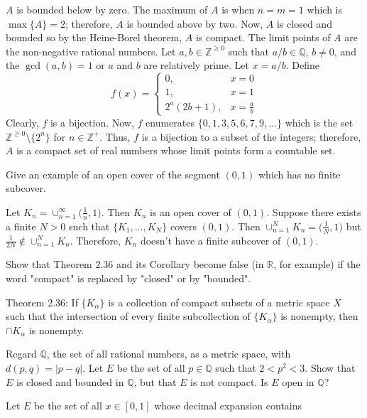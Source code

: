 \begin{exercise}
  \(A\) is bounded below by zero.
  The maximum of \(A\) is when \(n = m = 1\) which is \(\max\{A\} = 2\);
  therefore, \(A\) is bounded above by two.
  Now, \(A\) is closed and bounded so by the Heine-Borel theorem, \(A\) is
  compact.
  The limit points of \(A\) are the non-negative rational numbers.
  Let \(a,b\in\mathbb{Z}^{\geq 0}\) such that \(a/b\in\mathbb{Q}\),
  \(b\neq 0\), and the \(\gcd(a,b) = 1\) or \(a\) and \(b\) are relatively
  prime.
  Let \(x = a/b\).
  Define
  \[
  f(x) =
  \begin{cases}
    0, & x = 0\\
    1, & x = 1\\
    2^a(2b + 1), & x = \frac{a}{b}
  \end{cases}
  \]
  Clearly, \(f\) is a bijection.
  Now, \(f\) enumerates \(\{0,1,3,5,6,7,9,\ldots\}\) which is the set
  \(\mathbb{Z}^{\geq 0}\setminus\{2^n\}\) for \(n\in\mathbb{Z}^+\).
  Thus, \(f\) is a bijection to a subset of the integers; therefore, \(A\) is
  a compact set of real numbers whose limit points form a countable set.
\item
  Give an example of an open cover of the segment \((0,1)\) which has no
  finite subcover.
  \par\smallskip
  Let \(K_n = \cup_{n = 1}^{\infty}\bigl(\frac{1}{n},1\bigr)\).
  Then \(K_n\) is an open cover of \((0,1)\).
  Suppose there exists a finite \(N > 0\) such that \(\{K_1,\ldots,K_N\}\)
  covers \((0,1)\).
  Then \(\cup_{n = 1}^NK_n = \bigl(\frac{1}{N},1\bigr)\) but
  \(\frac{1}{2N}\notin\cup_{n = 1}^NK_n\).
  Therefore, \(K_n\) doesn't have a finite subcover of \((0,1)\).
\item
  Show that Theorem \(2.36\) and its Corollary become false (in \(\mathbb{R}\),
  for example) if the word "compact" is replaced by "closed" or by "bounded".
  \par\smallskip
  Theorem \(2.36\): If \(\{K_{\alpha}\}\) is a collection of compact subsets of
  a metric space \(X\) such that the intersection of every finite subcollection
  of \(\{K_{\alpha}\}\) is nonempty, then \(\cap K_{\alpha}\) is nonempty.
\item
  Regard \(\mathbb{Q}\), the set of all rational numbers, as a metric space,
  with \(d(p, q) = \lvert p - q\rvert\).
  Let \(E\) be the set of all \(p\in\mathbb{Q}\) such that \(2 < p^2 < 3\).
  Show that \(E\) is closed and bounded in \(\mathbb{Q}\), but that \(E\) is
  not compact.
  Is \(E\) open in \(\mathbb{Q}\)?
\item
  Let \(E\) be the set of all \(x\in[0, 1]\) whose decimal expansion contains

\end{exercise}
